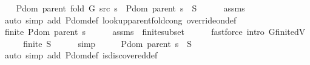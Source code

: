 \begin{isabellebody}
\ \ \isamarkupfalse%
\ {\isachardoublequoteopen}P{\isachardot}{\kern0pt}dom\ {\isacharparenleft}{\kern0pt}parent\ {\isacharparenleft}{\kern0pt}fold\ G\ src\ s{\isacharparenright}{\kern0pt}{\isacharparenright}{\kern0pt}\ {\isacharequal}{\kern0pt}\ P{\isachardot}{\kern0pt}dom\ {\isacharparenleft}{\kern0pt}parent\ s{\isacharparenright}{\kern0pt}\ {\isasymunion}\ {\isacharquery}{\kern0pt}S{\isachardoublequoteclose}\isanewline
\ \ \ \ \isamarkupfalse%
\ assms{\isacharparenleft}{\kern0pt}{}{\isacharcomma}{\kern0pt}\ {}{\isacharparenright}{\kern0pt}\isanewline
\ \ \ \ \isamarkupfalse%
\ {\isacharparenleft}{\kern0pt}auto\ simp\ add{\isacharcolon}{\kern0pt}\ P{\isachardot}{\kern0pt}dom{\isacharunderscore}{\kern0pt}def\ lookup{\isacharunderscore}{\kern0pt}parent{\isacharunderscore}{\kern0pt}fold{\isacharunderscore}{\kern0pt}cong{\isacharunderscore}{\kern0pt}{}\ override{\isacharunderscore}{\kern0pt}on{\isacharunderscore}{\kern0pt}def{\isacharparenright}{\kern0pt}\isanewline
\ \ \isamarkupfalse%
\ \isamarkupfalse%
\ {\isachardoublequoteopen}finite\ {\isacharparenleft}{\kern0pt}P{\isachardot}{\kern0pt}dom\ {\isacharparenleft}{\kern0pt}parent\ s{\isacharparenright}{\kern0pt}{\isacharparenright}{\kern0pt}{\isachardoublequoteclose}\isanewline
\ \ \ \ \isamarkupfalse%
\ assms{\isacharparenleft}{\kern0pt}{}{\isacharcomma}{\kern0pt}\ {}{\isacharparenright}{\kern0pt}\ finite{\isacharunderscore}{\kern0pt}subset\isanewline
\ \ \ \ \isamarkupfalse%
\ {\isacharparenleft}{\kern0pt}fastforce\ intro{\isacharcolon}{\kern0pt}\ G{\isachardot}{\kern0pt}finite{\isacharunderscore}{\kern0pt}dV{\isacharparenright}{\kern0pt}\isanewline
\ \ \isamarkupfalse%
\ \isamarkupfalse%
\ {\isachardoublequoteopen}finite\ {\isacharquery}{\kern0pt}S{\isachardoublequoteclose}\isanewline
\ \ \ \ \isamarkupfalse%
\ simp\isanewline
\ \ \isamarkupfalse%
\ \isamarkupfalse%
\ {\isachardoublequoteopen}P{\isachardot}{\kern0pt}dom\ {\isacharparenleft}{\kern0pt}parent\ s{\isacharparenright}{\kern0pt}\ {\isasyminter}\ {\isacharquery}{\kern0pt}S\ {\isacharequal}{\kern0pt}\ {\isacharbraceleft}{\kern0pt}{\isacharbraceright}{\kern0pt}{\isachardoublequoteclose}\isanewline
\ \ \ \ \isamarkupfalse%
\ {\isacharparenleft}{\kern0pt}auto\ simp\ add{\isacharcolon}{\kern0pt}\ P{\isachardot}{\kern0pt}dom{\isacharunderscore}{\kern0pt}def\ is{\isacharunderscore}{\kern0pt}discovered{\isacharunderscore}{\kern0pt}def{\isacharparenright}{\kern0pt}\isanewline

\end{isabellebody}

